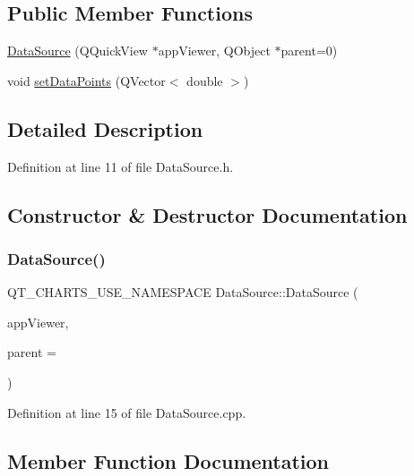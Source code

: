 \subsection*{Public Member Functions}
\begin{DoxyCompactItemize}
\item 
\hyperlink{class_data_source_a3aa0452261d490b282b692d6fccb1f85}{Data\+Source} (Q\+Quick\+View $\ast$app\+Viewer, Q\+Object $\ast$parent=0)
\item 
void \hyperlink{class_data_source_a2252a031274454cdefcc4c870fa5c3fd}{set\+Data\+Points} (Q\+Vector$<$ double $>$)
\end{DoxyCompactItemize}


\subsection{Detailed Description}


Definition at line 11 of file Data\+Source.\+h.



\subsection{Constructor \& Destructor Documentation}
\mbox{\label{class_data_source_a3aa0452261d490b282b692d6fccb1f85}} 
\subsubsection{\texorpdfstring{Data\+Source()}{DataSource()}}
{\footnotesize\ttfamily Q\+T\+\_\+\+C\+H\+A\+R\+T\+S\+\_\+\+U\+S\+E\+\_\+\+N\+A\+M\+E\+S\+P\+A\+CE Data\+Source\+::\+Data\+Source (\begin{DoxyParamCaption}\item[{Q\+Quick\+View $\ast$}]{app\+Viewer,  }\item[{Q\+Object $\ast$}]{parent = {} }\end{DoxyParamCaption})\hspace{0.3cm}{\ttfamily [explicit]}}



Definition at line 15 of file Data\+Source.\+cpp.



\subsection{Member Function Documentation}
\mbox{\label{class_data_source_a2252a031274454cdefcc4c870fa5c3fd}} 
